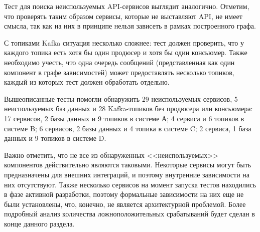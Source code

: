 Тест для поиска неиспользуемых API-сервисов выглядит аналогично. Отметим, что проверять таким образом сервисы, которые не выставляют API, не имеет смысла, так как на них в принципе нельзя зависеть в рамках построенного графа.


С топиками Kafka ситуация несколько сложнее: тест должен проверить, что у каждого топика есть хотя бы один продюсер и хотя бы один консьюмер. Также необходимо учесть, что одна очередь сообщений (представленная как один компонент в графе зависимостей) может предоставлять несколько топиков, каждый из которых тест должен обработать отдельно. 


Вышеописанные тесты помогли обнаружить 29 неиспользуемых сервисов, 5 неиспользуемых баз данных и 28 Kafka-топиков без продюсера или консьюмера: 17 сервисов, 2 базы данных и 9 топиков в системе А; 4 сервиса и 6 топиков в системе B; 6 сервисов, 2 базы данных и 4 топика в системе C; 2 сервиса, 1 база данных и 9 топиков в системе D. 

Важно отметить, что не все из обнаруженных <<неиспользуемых>> компонентов действительно являются таковыми. Некоторые сервисы могут быть предназначены для внешних интеграций, и поэтому внутренние зависимости на них отсутствуют. Также несколько сервисов на момент запуска тестов находились в фазе активной разработки, поэтому формальные зависимости на них еще не были установлены, что, конечно, не является архитектурной проблемой. Более подробный анализ количества ложноположительных срабатываний будет сделан в конце данного раздела.

